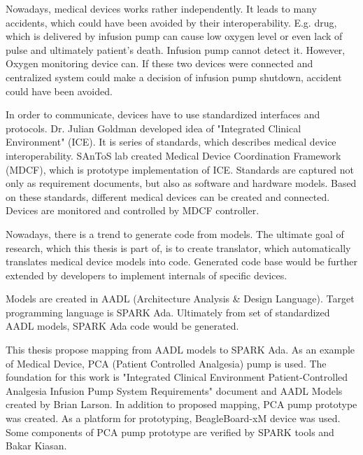 
\pagestyle{empty}
\setlength{\baselineskip}{0.8cm}

\indent


Nowadays, medical devices works rather independently. It leads to many accidents, which could have been avoided by their interoperability. E.g. drug, which is delivered by infusion pump can cause low oxygen level or even lack of pulse and ultimately patient's death. Infusion pump cannot detect it. However, Oxygen monitoring device can. If these two devices were connected and centralized system could make a decision of infusion pump shutdown, accident could have been avoided. 

In order to communicate, devices have to use standardized interfaces and protocols. Dr. Julian Goldman developed idea of "Integrated Clinical Environment" (ICE). It is series of standards, which describes medical device interoperability. SAnToS lab created Medical Device Coordination Framework (MDCF), which is prototype implementation of ICE. Standards are captured not only as requirement documents, but also as software and hardware models. Based on these standards, different medical devices can be created and connected. Devices are monitored and controlled by MDCF controller.

Nowadays, there is a trend to generate code from models. The ultimate goal of research, which this thesis is part of, is to create translator, which automatically translates medical device models into code. Generated code base would be further extended by developers to implement internals of specific devices. 

Models are created in AADL (Architecture Analysis \& Design Language). Target programming language is SPARK Ada. Ultimately from set of standardized AADL models, SPARK Ada code would be generated. 

This thesis propose mapping from AADL models to SPARK Ada. As an example of Medical Device, PCA (Patient Controlled Analgesia) pump is used. The foundation for this work is "Integrated Clinical Environment Patient-Controlled Analgesia Infusion Pump System Requirements" document \cite{PcaReq} and AADL Models created by Brian Larson. In addition to proposed mapping, PCA pump prototype was created. As a platform for prototyping, BeagleBoard-xM device was used. Some components of PCA pump prototype are verified by SPARK tools and Bakar Kiasan.

